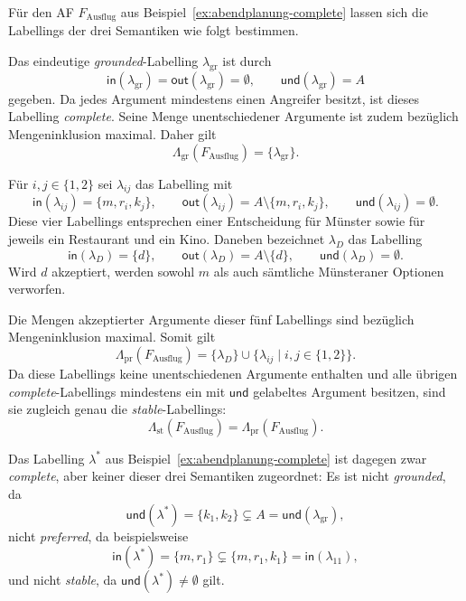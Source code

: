 \begin{Example}
    \label{ex:abendplanung-semantiken}
    Für den AF \(F_{\mathrm{Ausflug}}\) aus
    Beispiel~\ref{ex:abendplanung-complete} lassen sich die Labellings
    der drei Semantiken wie folgt bestimmen.

    Das eindeutige \emph{grounded}-Labelling
    \(\lambda_{\mathrm{gr}}\) ist durch
    \[
        \mathsf{in}(\lambda_{\mathrm{gr}})
        =\mathsf{out}(\lambda_{\mathrm{gr}})=\emptyset,
        \qquad
        \mathsf{und}(\lambda_{\mathrm{gr}})=A
    \]
    gegeben. Da jedes Argument mindestens einen Angreifer besitzt, ist
    dieses Labelling \emph{complete}. Seine Menge unentschiedener
    Argumente ist zudem bezüglich Mengeninklusion maximal. Daher gilt
    \[
        \Lambda_{\mathrm{gr}}(F_{\mathrm{Ausflug}})
        =\{\lambda_{\mathrm{gr}}\}.
    \]

    Für \(i,j\in\{1,2\}\) sei \(\lambda_{ij}\) das Labelling mit
    \[
        \mathsf{in}(\lambda_{ij})=\{m,r_i,k_j\},\qquad
        \mathsf{out}(\lambda_{ij})
        =A\setminus\{m,r_i,k_j\},\qquad
        \mathsf{und}(\lambda_{ij})=\emptyset.
    \]
    Diese vier Labellings entsprechen einer Entscheidung für Münster
    sowie für jeweils ein Restaurant und ein Kino. Daneben bezeichnet
    \(\lambda_D\) das Labelling
    \[
        \mathsf{in}(\lambda_D)=\{d\},\qquad
        \mathsf{out}(\lambda_D)=A\setminus\{d\},\qquad
        \mathsf{und}(\lambda_D)=\emptyset.
    \]
    Wird \(d\) akzeptiert, werden sowohl \(m\) als auch sämtliche
    Münsteraner Optionen verworfen.

    Die Mengen akzeptierter Argumente dieser fünf Labellings sind
    bezüglich Mengeninklusion maximal. Somit gilt
    \[
        \Lambda_{\mathrm{pr}}(F_{\mathrm{Ausflug}})
        =
        \{\lambda_D\}
        \cup
        \{\lambda_{ij}\mid i,j\in\{1,2\}\}.
    \]
    Da diese Labellings keine unentschiedenen Argumente enthalten und
    alle übrigen \emph{complete}-Labellings mindestens ein mit
    \(\mathsf{und}\) gelabeltes Argument besitzen, sind sie zugleich
    genau die \emph{stable}-Labellings:
    \[
        \Lambda_{\mathrm{st}}(F_{\mathrm{Ausflug}})
        =
        \Lambda_{\mathrm{pr}}(F_{\mathrm{Ausflug}}).
    \]

    Das Labelling \(\lambda^\ast\) aus
    Beispiel~\ref{ex:abendplanung-complete} ist dagegen zwar
    \emph{complete}, aber keiner dieser drei Semantiken zugeordnet:
    Es ist nicht \emph{grounded}, da
    \[
        \mathsf{und}(\lambda^\ast)=\{k_1,k_2\}
        \subsetneq A
        =\mathsf{und}(\lambda_{\mathrm{gr}}),
    \]
    nicht \emph{preferred}, da beispielsweise
    \[
        \mathsf{in}(\lambda^\ast)=\{m,r_1\}
        \subsetneq
        \{m,r_1,k_1\}
        =\mathsf{in}(\lambda_{11}),
    \]
    und nicht \emph{stable}, da
    \(\mathsf{und}(\lambda^\ast)\neq\emptyset\) gilt.
\end{Example}

